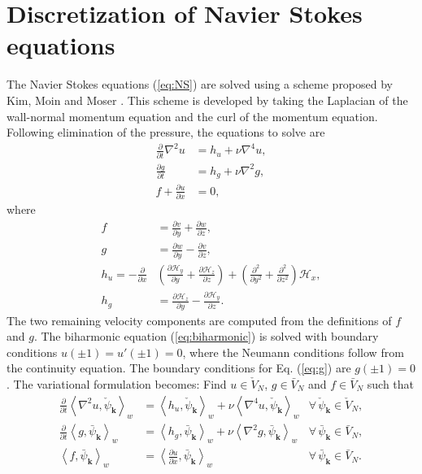 \documentclass[preprint]{elsarticle}
\newcommand{\N}[1]{\check{#1}}
\newcommand{\D}[1]{\bar{#1}}
\begin{document}
\section{Discretization of Navier Stokes equations}
\label{sec:discretizationNS}
The Navier Stokes equations (\ref{eq:NS}) are solved using a scheme 
proposed by Kim, Moin and Moser \cite{Kim87}. This scheme is developed by taking the 
Laplacian of the wall-normal momentum equation and the curl of the momentum 
equation. Following elimination of the pressure, the equations to solve are 
\begin{align}
\frac{\partial}{\partial t} \nabla^2 u &= h_u + \nu \nabla^4 u, 
\label{eq:biharmonic} \\
\frac{\partial g}{\partial t} &= h_g + \nu \nabla^2 g, \label{eq:g} \\
f + \frac{\partial u}{\partial x} &= 0, \label{eq:f}
\end{align}
where
\begin{align}
f &= \frac{\partial v}{\partial y} + \frac{\partial w}{\partial z}, \\
g &= \frac{\partial w}{\partial y} - \frac{\partial v}{\partial z}, \\
h_u = -\frac{\partial}{\partial x} &\left( \frac{\partial 
\mathcal{H}_y}{\partial y} + \frac{\partial \mathcal{H}_z}{\partial z} \right) 
+ \left(\frac{\partial^2}{\partial y^2} + \frac{\partial^2}{\partial z^2} 
\right) \mathcal{H}_x ,
\\
h_g &= \frac{\partial \mathcal{H}_z}{\partial y} - \frac{\partial 
\mathcal{H}_y}{\partial z}.
\end{align}
The two remaining velocity components are computed from the definitions of $f$ 
and $g$. The biharmonic equation (\ref{eq:biharmonic}) is solved with boundary 
conditions $u(\pm 1) = u'(\pm 1) = 0$, where the Neumann conditions follow 
from the continuity equation. The boundary conditions for Eq. (\ref{eq:g}) are 
$g(\pm 1) = 0$. The variational formulation becomes: Find ${u} \in 
\N{V}_N$, ${g} \in \D{V}_N$ and ${f} \in \D{V}_N$ such that
\begin{align}
	\frac{\partial }{\partial t} \left< \nabla^2 u, \N{\psi}_{\bm{k}}\right>_w &= 
	\left<h_u, \N{\psi}_{\bm{k}} \right>_w + \nu \left<\nabla^4u, \N{\psi}_{\bm{k}}\right>_w 
	&\forall \,\N{\psi}_{\bm{k}} \in \N{V}_N, \label{eq:u1} \\
	\frac{\partial}{\partial t}\left<g, \D{\psi}_{\bm{k}}\right>_w &= \left<h_g, 
	\D{\psi}_{\bm{k}}\right>_w + \nu 
	\left<\nabla^2 g, \D{\psi}_{\bm{k}}\right>_w &\forall \, \D{\psi}_{\bm{k}} \in \D{V}_N ,
	\label{eq:g1} \\
	\left<f, \D{\psi}_{\bm{k}}\right>_w &= \left<\frac{\partial u}{\partial x}, 
	\D{\psi}_{\bm{k}}\right>_w &\forall \, \D{\psi}_{\bm{k}} \in \D{V}_N. \label{eq:f1}
\end{align}
\end{document}
